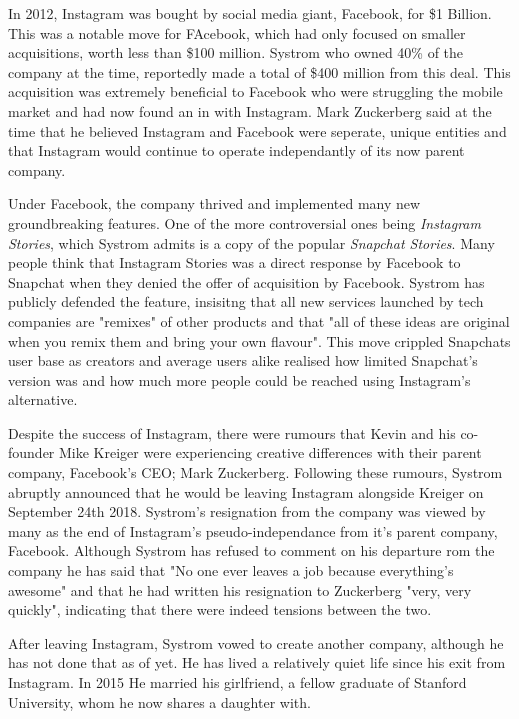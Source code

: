 \documentclass[12pt]{article}
\begin{document}
    In 2012, Instagram was bought by social media giant, Facebook, for \$1 Billion. This was a notable move for FAcebook, which had only focused on smaller acquisitions,
    worth less than \$100 million.
    Systrom who owned 40\% of the company at the time,
    reportedly made a total of \$400 million from this deal. This acquisition was extremely beneficial to Facebook who were 
    struggling the mobile market and had now found an in with Instagram. 
    Mark Zuckerberg said at the time that he believed Instagram and Facebook were seperate, unique entities 
    and that Instagram would continue to operate independantly of its now parent company.

    Under Facebook, the company thrived and implemented many new groundbreaking features. One of the more controversial ones being \textit{Instagram Stories}, which Systrom admits is a copy of the
    popular \textit{Snapchat Stories}. Many people think that Instagram Stories was a direct response by Facebook to Snapchat when they denied the offer of acquisition by Facebook.
    Systrom has publicly defended the feature, insisitng that all new services launched by tech companies are "remixes" of other products and that
    "all of these ideas are original when you remix them and bring your own flavour". This move crippled Snapchats user base as creators and average users alike realised how limited
    Snapchat's version was and how much more people could be reached using Instagram's alternative. 

    Despite the success of Instagram, there were rumours that 
    Kevin and his co-founder Mike Kreiger were experiencing 
    creative differences with their parent company, Facebook's CEO; Mark Zuckerberg. Following these rumours, Systrom abruptly
    announced that he would be leaving Instagram alongside Kreiger on September 24th 2018. Systrom's resignation from the company was viewed 
    by many as the end of Instagram's pseudo-independance from it's parent company, Facebook.
    Although Systrom has refused to comment on his departure rom the company he has said that "No one ever leaves a job because everything's awesome"
    and that he had written his resignation to Zuckerberg "very, very quickly", indicating that there were indeed tensions between the two.
    
    After leaving Instagram, Systrom vowed to create another company, although he has not done that as of yet. He 
    has lived a relatively quiet life since his exit from Instagram. In 2015 He married his girlfriend, 
    a fellow graduate of Stanford University, whom he now shares a daughter with.
    
\end{document}

